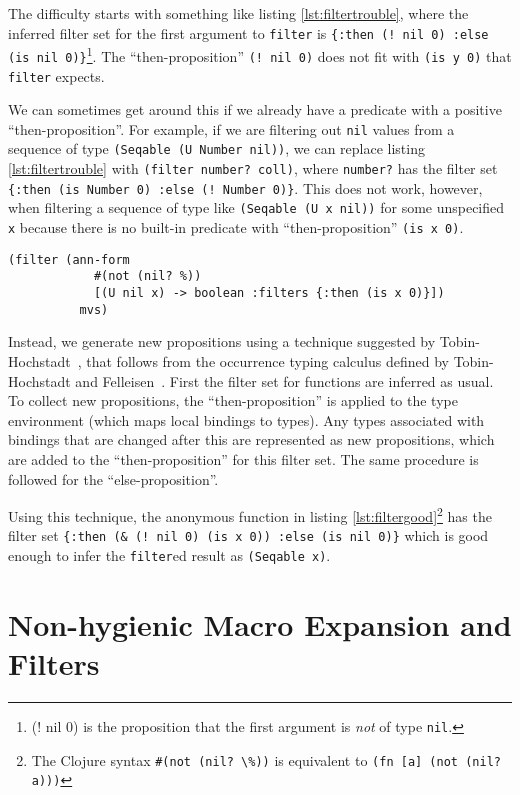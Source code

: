 The difficulty starts with something like listing \ref{lst:filtertrouble},
where the inferred filter set for the first argument to \lstinline|filter|
is \lstinline|{:then (! nil 0) :else (is nil 0)}|\footnote{(! nil 0) is the proposition that the first argument is \emph{not}
of type \lstinline|nil|.}. The ``then-proposition'' \lstinline|(! nil 0)| does not fit with
\lstinline|(is y 0)| that \lstinline|filter| expects.

We can sometimes get around this if we already have a predicate with a positive
``then-proposition''. For example, if we are filtering out \lstinline|nil| values
from a sequence of type \lstinline|(Seqable (U Number nil))|, we can replace
listing \ref{lst:filtertrouble} with \lstinline|(filter number? coll)|,
where \lstinline|number?| has the filter set \lstinline|{:then (is Number 0) :else (! Number 0)}|.
This does not work, however, when filtering a sequence of type like \lstinline|(Seqable (U x nil))|
for some unspecified \lstinline|x| because there is no built-in predicate with ``then-proposition''
\lstinline|(is x 0)|.

\begin{lstlisting}[caption=Filtering with negative propositions, label=lst:filtergood]
  (filter (ann-form 
            #(not (nil? %))
            [(U nil x) -> boolean :filters {:then (is x 0)}])
          mvs)
\end{lstlisting}

Instead, we generate new propositions using a technique 
suggested by Tobin-Hochstadt~\cite{Tob12},
that follows from the occurrence typing calculus defined 
by Tobin-Hochstadt and Felleisen~\cite{TF10}.
First the filter set for functions are inferred as usual.
To collect new propositions, the ``then-proposition'' is applied to the type environment (which maps
local bindings to types). Any types associated with bindings that are changed after this
are represented as new propositions, which are added to the ``then-proposition'' for this filter set.
The same procedure is followed for the ``else-proposition''.

Using this technique, the anonymous function in listing 
\ref{lst:filtergood}\footnote{The Clojure syntax \lstinline|#(not (nil? \%))| 
is equivalent to \lstinline|(fn [a] (not (nil? a)))|}
has the filter set \lstinline|{:then (& (! nil 0) (is x 0)) :else (is nil 0)}|
which is good enough to infer the \lstinline|filter|ed result as \lstinline|(Seqable x)|.

\section{Non-hygienic Macro Expansion and Filters}


